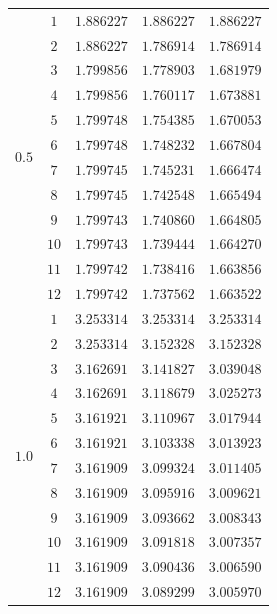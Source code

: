 \documentclass[
    a4paper, aps, twocolumn, floatfix, superscriptaddress,
    nofootinbib]{revtex4-1}
\newcommand{\1}{\mathds{1}}
\begin{document}
\begin{table}
\begin{ruledtabular}
\begin{tabular}{c|c|ccc}
                               &  $1$  & $1.886227$ & $1.886227$ & $1.886227$ \\
                               &  $2$  & $1.886227$ & $1.786914$ & $1.786914$ \\
                               &  $3$  & $1.799856$ & $1.778903$ & $1.681979$ \\
                               &  $4$  & $1.799856$ & $1.760117$ & $1.673881$ \\
                               &  $5$  & $1.799748$ & $1.754385$ & $1.670053$ \\
        \multirow{2}{*}{$0.5$} &  $6$  & $1.799748$ & $1.748232$ & $1.667804$ \\
                               &  $7$  & $1.799745$ & $1.745231$ & $1.666474$ \\
                               &  $8$  & $1.799745$ & $1.742548$ & $1.665494$ \\
                               &  $9$  & $1.799743$ & $1.740860$ & $1.664805$ \\
                               &  $10$ & $1.799743$ & $1.739444$ & $1.664270$ \\
                               &  $11$ & $1.799742$ & $1.738416$ & $1.663856$ \\
                               &  $12$ & $1.799742$ & $1.737562$ & $1.663522$ \\
                    \hline

                               &  $1$  & $3.253314$ & $3.253314$ & $3.253314$ \\
                               &  $2$  & $3.253314$ & $3.152328$ & $3.152328$ \\
                               &  $3$  & $3.162691$ & $3.141827$ & $3.039048$ \\
                               &  $4$  & $3.162691$ & $3.118679$ & $3.025273$ \\
                               &  $5$  & $3.161921$ & $3.110967$ & $3.017944$ \\
        \multirow{2}{*}{$1.0$} &  $6$  & $3.161921$ & $3.103338$ & $3.013923$ \\
                               &  $7$  & $3.161909$ & $3.099324$ & $3.011405$ \\
                               &  $8$  & $3.161909$ & $3.095916$ & $3.009621$ \\
                               &  $9$  & $3.161909$ & $3.093662$ & $3.008343$ \\
                               &  $10$ & $3.161909$ & $3.091818$ & $3.007357$ \\
                               &  $11$ & $3.161909$ & $3.090436$ & $3.006590$ \\
                               &  $12$ & $3.161909$ & $3.089299$ & $3.005970$ \\
                    \hline


\end{tabular}
\end{ruledtabular}
\end{table}
\end{document}

